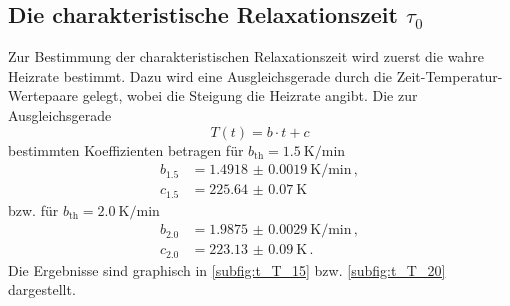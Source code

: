 \subsection{Die charakteristische Relaxationszeit \texorpdfstring{$\tau_0$}{tau0}}
Zur Bestimmung der charakteristischen Relaxationszeit wird zuerst die wahre Heizrate bestimmt.
Dazu wird eine Ausgleichsgerade durch die Zeit-Temperatur-Wertepaare gelegt, wobei die Steigung die Heizrate angibt.
Die zur Ausgleichsgerade
\begin{equation*}
    T(t) = b \cdot t + c
\end{equation*}
bestimmten Koeffizienten betragen für $b_\text{th} = \SI{1.5}{\kelvin \per \minute}$
\begin{align*}
    b_{1.5} &= \SI{1.4918(19)}{\kelvin \per \minute} \, , \\
    c_{1.5} &= \SI{225.64(7)}{\kelvin} 
\end{align*}
bzw. für $b_\text{th} = \SI{2.0}{\kelvin \per \minute}$
\begin{align*}
    b_{2.0} &= \SI{1.9875(29)}{\kelvin \per \minute} \, , \\
    c_{2.0} &= \SI{223.13(9)}{\kelvin} \, .
\end{align*}
Die Ergebnisse sind graphisch in \autoref{subfig:t_T_15} bzw. \autoref{subfig:t_T_20} dargestellt.

